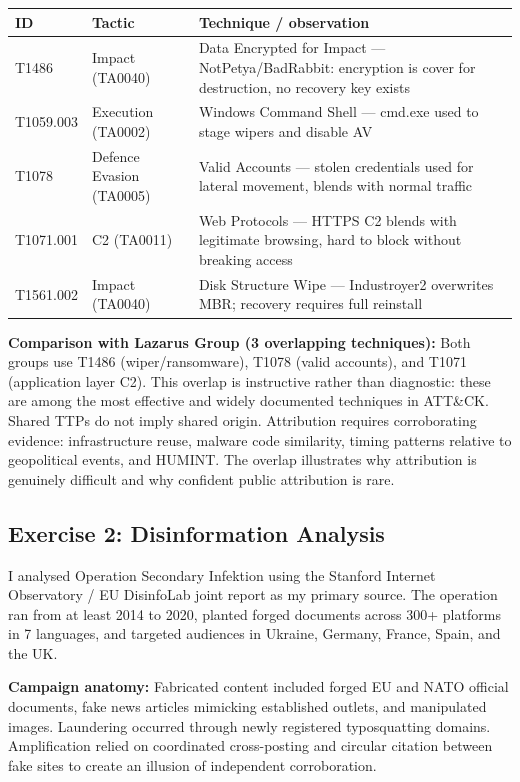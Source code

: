 \documentclass[11pt,a4paper]{article}
\begin{document}
\small
\begin{tabularx}{\linewidth}{>{\ttfamily}l l >{\raggedright\arraybackslash}X}
\toprule
\normalfont ID & Tactic & Technique / observation \\
\midrule
T1486     & Impact (TA0040)             & Data Encrypted for Impact --- NotPetya/BadRabbit: encryption is cover for destruction, no recovery key exists \\
T1059.003 & Execution (TA0002)          & Windows Command Shell --- cmd.exe used to stage wipers and disable AV \\
T1078     & Defence Evasion (TA0005)    & Valid Accounts --- stolen credentials used for lateral movement, blends with normal traffic \\
T1071.001 & C2 (TA0011)                 & Web Protocols --- HTTPS C2 blends with legitimate browsing, hard to block without breaking access \\
T1561.002 & Impact (TA0040)             & Disk Structure Wipe --- Industroyer2 overwrites MBR; recovery requires full reinstall \\
\bottomrule
\end{tabularx}
\normalsize

\vspace{6pt}
\noindent\textbf{Comparison with Lazarus Group (3 overlapping techniques):}
Both groups use T1486 (wiper/ransomware), T1078 (valid accounts), and T1071
(application layer C2). This overlap is instructive rather than diagnostic: these
are among the most effective and widely documented techniques in ATT\&CK. Shared
TTPs do not imply shared origin. Attribution requires corroborating evidence:
infrastructure reuse, malware code similarity, timing patterns relative to
geopolitical events, and HUMINT. The overlap illustrates why attribution is
genuinely difficult and why confident public attribution is rare.

\subsection{Exercise 2: Disinformation Analysis}

I analysed Operation Secondary Infektion using the Stanford Internet Observatory /
EU DisinfoLab joint report as my primary source. The operation ran from at least
2014 to 2020, planted forged documents across 300+ platforms in 7 languages, and
targeted audiences in Ukraine, Germany, France, Spain, and the UK.

\noindent\textbf{Campaign anatomy:} Fabricated content included forged EU and NATO
official documents, fake news articles mimicking established outlets, and
manipulated images. Laundering occurred through newly registered typosquatting
domains. Amplification relied on coordinated cross-posting and circular citation
between fake sites to create an illusion of independent corroboration.
\end{document}
